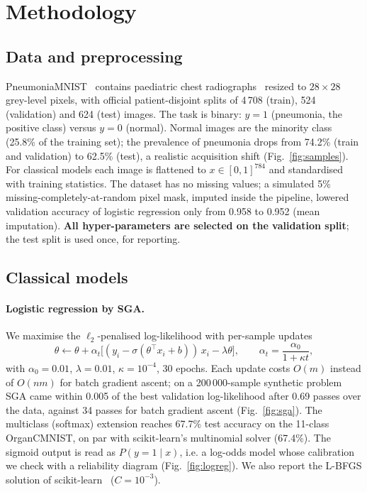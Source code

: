 \documentclass[11pt,a4paper]{article}
\makeatletter
\newcommand{\ie}{i.e.\@\xspace}
\makeatother
\begin{document}
\section{Methodology}
\subsection{Data and preprocessing}
PneumoniaMNIST~\cite{yang2023medmnist} contains paediatric chest radiographs~\cite{kermany2018identifying} resized to
$28\times28$ grey-level pixels, with official patient-disjoint splits of 4\,708 (train), 524 (validation) and 624
(test) images. The task is binary: $y=1$ (pneumonia, the positive class) versus $y=0$ (normal). Normal images are the
minority class (25.8\% of the training set); the prevalence of pneumonia drops from 74.2\% (train and validation) to
62.5\% (test), a realistic acquisition shift (Fig.~\ref{fig:samples}). For classical models each image is flattened
to $x\in[0,1]^{784}$ and standardised with training statistics. The dataset has no missing values; a simulated 5\%
missing-completely-at-random pixel mask, imputed inside the pipeline, lowered validation accuracy of logistic regression
only from 0.958 to 0.952 (mean imputation). \textbf{All hyper-parameters are selected on the validation split}; the test
split is used once, for reporting.

\subsection{Classical models}
\paragraph{Logistic regression by SGA.} We maximise the $\ell_2$-penalised log-likelihood with per-sample updates
\begin{equation}
  \theta \leftarrow \theta + \alpha_t\big[(y_i - \sigma(\theta^\top x_i + b))\,x_i - \lambda\theta\big],\qquad
  \alpha_t = \frac{\alpha_0}{1+\kappa t},
\end{equation}
with $\alpha_0=0.01$, $\lambda=0.01$, $\kappa=10^{-4}$, 30 epochs. Each update costs $O(m)$ instead of $O(nm)$ for
batch gradient ascent; on a 200\,000-sample synthetic problem SGA came within 0.005 of the best validation
log-likelihood after 0.69 passes over the data, against 34 passes for batch gradient ascent (Fig.~\ref{fig:sga}).
The multiclass (softmax) extension reaches 67.7\% test accuracy on the 11-class OrganCMNIST, on par with scikit-learn's
multinomial solver (67.4\%). The sigmoid output is read as $P(y=1\mid x)$, \ie a log-odds model whose calibration we
check with a reliability diagram (Fig.~\ref{fig:logreg}). We also report the L-BFGS solution of
scikit-learn~\cite{pedregosa2011scikit} ($C=10^{-3}$).
\end{document}
